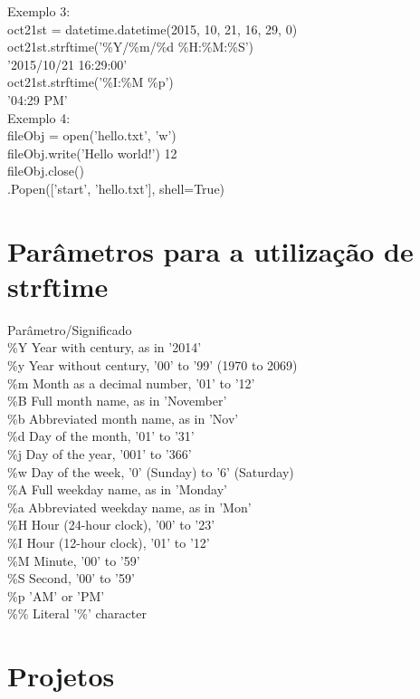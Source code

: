 \documentclass[12pt, a4paper]{article}
\begin{document}
	
	Exemplo 3:\\oct21st = datetime.datetime(2015, 10, 21, 16, 29, 0)\\oct21st.strftime('\%Y/\%m/\%d \%H:\%M:\%S')\\'2015/10/21 16:29:00'\\oct21st.strftime('\%I:\%M \%p')\\'04:29 PM'\\
	
	Exemplo 4:\\fileObj = open('hello.txt', 'w')\\fileObj.write('Hello world!')
	12\\fileObj.close()\\\subprocess.Popen(['start', 'hello.txt'], shell=True)\\
	
\section{Parâmetros para a utilização de strftime}
Parâmetro/Significado\\
\%Y	Year with century, as in '2014'\\
\%y	Year without century, '00' to '99' (1970 to 2069)\\
\%m	Month as a decimal number, '01' to '12'\\
\%B	Full month name, as in 'November'\\
\%b	Abbreviated month name, as in 'Nov'\\
\%d	Day of the month, '01' to '31'\\
\%j	Day of the year, '001' to '366'\\
\%w	Day of the week, '0' (Sunday) to '6' (Saturday)\\
\%A	Full weekday name, as in 'Monday'\\
\%a	Abbreviated weekday name, as in 'Mon'\\
\%H	Hour (24-hour clock), '00' to '23'\\
\%I	Hour (12-hour clock), '01' to '12'\\
\%M	Minute, '00' to '59'\\
\%S	Second, '00' to '59'\\
\%p	'AM' or 'PM'\\
\%\%	Literal '\%' character

\section{Projetos}
\end{document}
